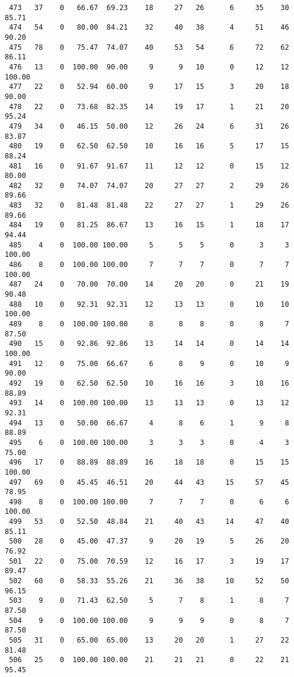 \begin{verbatim}
 473   37    0   66.67  69.23    18     27   26      6     35    30    85.71
 474   54    0   80.00  84.21    32     40   38      4     51    46    90.20
 475   78    0   75.47  74.07    40     53   54      6     72    62    86.11
 476   13    0  100.00  90.00     9      9   10      0     12    12   100.00
 477   22    0   52.94  60.00     9     17   15      3     20    18    90.00
 478   22    0   73.68  82.35    14     19   17      1     21    20    95.24
 479   34    0   46.15  50.00    12     26   24      6     31    26    83.87
 480   19    0   62.50  62.50    10     16   16      5     17    15    88.24
 481   16    0   91.67  91.67    11     12   12      0     15    12    80.00
 482   32    0   74.07  74.07    20     27   27      2     29    26    89.66
 483   32    0   81.48  81.48    22     27   27      1     29    26    89.66
 484   19    0   81.25  86.67    13     16   15      1     18    17    94.44
 485    4    0  100.00 100.00     5      5    5      0      3     3   100.00
 486    8    0  100.00 100.00     7      7    7      0      7     7   100.00
 487   24    0   70.00  70.00    14     20   20      0     21    19    90.48
 488   10    0   92.31  92.31    12     13   13      0     10    10   100.00
 489    8    0  100.00 100.00     8      8    8      0      8     7    87.50
 490   15    0   92.86  92.86    13     14   14      0     14    14   100.00
 491   12    0   75.00  66.67     6      8    9      0     10     9    90.00
 492   19    0   62.50  62.50    10     16   16      3     18    16    88.89
 493   14    0  100.00 100.00    13     13   13      0     13    12    92.31
 494   13    0   50.00  66.67     4      8    6      1      9     8    88.89
 495    6    0  100.00 100.00     3      3    3      0      4     3    75.00
 496   17    0   88.89  88.89    16     18   18      0     15    15   100.00
 497   69    0   45.45  46.51    20     44   43     15     57    45    78.95
 498    8    0  100.00 100.00     7      7    7      0      6     6   100.00
 499   53    0   52.50  48.84    21     40   43     14     47    40    85.11
 500   28    0   45.00  47.37     9     20   19      5     26    20    76.92
 501   22    0   75.00  70.59    12     16   17      3     19    17    89.47
 502   60    0   58.33  55.26    21     36   38     10     52    50    96.15
 503    9    0   71.43  62.50     5      7    8      1      8     7    87.50
 504    9    0  100.00 100.00     9      9    9      0      8     7    87.50
 505   31    0   65.00  65.00    13     20   20      1     27    22    81.48
 506   25    0  100.00 100.00    21     21   21      0     22    21    95.45

\end{verbatim}
